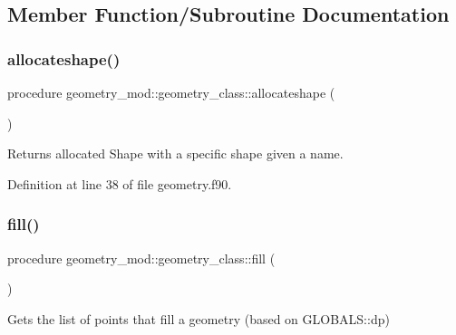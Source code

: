 \subsection{Member Function/\+Subroutine Documentation}
\mbox{\label{structgeometry__mod_1_1geometry__class_a435975f73e28fc8c9f04b47c390cb089}} 
\subsubsection{\texorpdfstring{allocateshape()}{allocateshape()}}
{\footnotesize\ttfamily procedure geometry\+\_\+mod\+::geometry\+\_\+class\+::allocateshape (\begin{DoxyParamCaption}{ }\end{DoxyParamCaption})\hspace{0.3cm}{\ttfamily [private]}}



Returns allocated Shape with a specific shape given a name. 



Definition at line 38 of file geometry.\+f90.

\mbox{\label{structgeometry__mod_1_1geometry__class_a0afee5607f0e2443a862741e40794368}} 
\subsubsection{\texorpdfstring{fill()}{fill()}}
{\footnotesize\ttfamily procedure geometry\+\_\+mod\+::geometry\+\_\+class\+::fill (\begin{DoxyParamCaption}{ }\end{DoxyParamCaption})\hspace{0.3cm}{\ttfamily [private]}}



Gets the list of points that fill a geometry (based on G\+L\+O\+B\+A\+L\+S\+::dp) 



